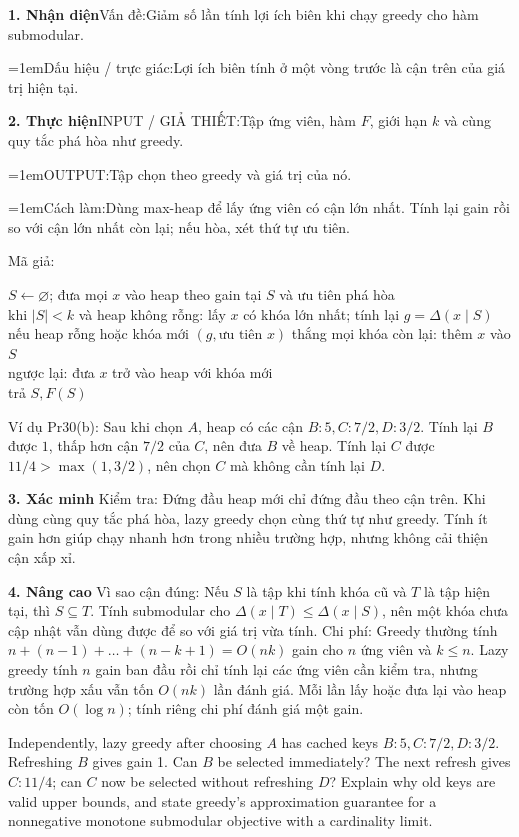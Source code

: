 \documentclass[10pt,a4paper,twocolumn]{article}
\makeatletter
\newcommand{\key}[1]{#1:\enspace}
\newcommand{\qlink}[2]{\hyperref[question:#1]{#2}}
\newcommand{\shareddataref}[1]{%
  \qlink{#1}{\mbox{[#1, tr.~\pageref*{question:#1}]}}}
\newcommand{\algfield}[2]{\par\noindent\hangindent=1em\relax#1:\enspace#2}
\newcommand{\unitheading}[2]{%
  \par\addvspace{1pt}\noindent\textbf{#1. #2}\enspace}
\newcommand{\unitverification}{\unitheading{3}{Xác minh}}
\newcommand{\unitadvanced}{\unitheading{4}{Nâng cao}}
\newcommand{\unitfield}[4]{%
  \par\noindent\textbf{#1. #2}\enspace #3:\enspace #4}
\newcommand{\algsummary}[6]{%
  \begingroup\setlength{\parskip}{1pt}%
  \unitfield{1}{Nhận diện}{Vấn đề}{#1}%
  \algfield{Dấu hiệu / trực giác}{#2}%
  \if\relax\detokenize{#3}\relax\else\par\noindent#3\par\fi%
  \unitfield{2}{Thực hiện}{INPUT / GIẢ THIẾT}{#4}%
  \algfield{OUTPUT}{#5}%
  \algfield{Cách làm}{#6}\par\endgroup}
\newenvironment{algpseudo}{%
  \par\addvspace{2pt}\noindent
  \setlength{\parskip}{0pt}%
  Mã giả:\par\nobreak
  \begin{list}{}{\setlength{\leftmargin}{1em}\setlength{\topsep}{0pt}%
    \setlength{\partopsep}{0pt}\setlength{\parsep}{0pt}%
    \@beginparpenalty=10000\relax}%
  \item\relax
}{\end{list}\par\addvspace{3pt}}
\makeatother
\begin{document}
\algsummary{Giảm số lần tính lợi ích biên khi chạy greedy cho hàm submodular.}{Lợi ích biên tính ở một vòng trước là cận trên của giá trị hiện tại.}{}{Tập ứng viên, hàm $F$, giới hạn $k$ và cùng quy tắc phá hòa như greedy.}{Tập chọn theo greedy và giá trị của nó.}{Dùng max-heap để lấy ứng viên có cận lớn nhất. Tính lại gain rồi so với cận lớn nhất còn lại; nếu hòa, xét thứ tự ưu tiên.}

\begin{algpseudo}
$S\gets\varnothing$; đưa mọi $x$ vào heap theo gain tại $S$ và ưu tiên phá hòa\\
khi $|S|<k$ và heap không rỗng: lấy $x$ có khóa lớn nhất; tính lại $g=\Delta(x\mid S)$\\
\quad nếu heap rỗng hoặc khóa mới $(g,\text{ưu tiên }x)$ thắng mọi khóa còn lại: thêm $x$ vào $S$\\
\quad ngược lại: đưa $x$ trở vào heap với khóa mới\\
trả $S,F(S)$
\end{algpseudo}

\key{Ví dụ Pr30(b)} Sau khi chọn $A$, heap có các cận $B:5,C:7/2,D:3/2$. Tính lại $B$ được $1$, thấp hơn cận $7/2$ của $C$, nên đưa $B$ về heap. Tính lại $C$ được $11/4>\max(1,3/2)$, nên chọn $C$ mà không cần tính lại $D$.

\unitverification
\key{Kiểm tra} Đứng đầu heap mới chỉ đứng đầu theo cận trên. Khi dùng cùng quy tắc phá hòa, lazy greedy chọn cùng thứ tự như greedy. Tính ít gain hơn giúp chạy nhanh hơn trong nhiều trường hợp, nhưng không cải thiện cận xấp xỉ.

\unitadvanced
\key{Vì sao cận đúng} Nếu $S$ là tập khi tính khóa cũ và $T$ là tập hiện tại, thì $S\subseteq T$. Tính submodular cho $\Delta(x\mid T)\le\Delta(x\mid S)$, nên một khóa chưa cập nhật vẫn dùng được để so với giá trị vừa tính.
\key{Chi phí} Greedy thường tính $n+(n-1)+\dots+(n-k+1)=O(nk)$ gain cho $n$ ứng viên và $k\le n$. Lazy greedy tính $n$ gain ban đầu rồi chỉ tính lại các ứng viên cần kiểm tra, nhưng trường hợp xấu vẫn tốn $O(nk)$ lần đánh giá. Mỗi lần lấy hoặc đưa lại vào heap còn tốn $O(\log n)$; tính riêng chi phí đánh giá một gain.

\ask{Pr30b}{Pr30(b)}{Dữ kiện chung: \shareddataref{Pr30}}
 Independently, lazy greedy after choosing $A$ has cached keys $B:5,C:7/2,D:3/2$. Refreshing $B$ gives gain 1. Can $B$ be selected immediately? The next refresh gives $C:11/4$; can $C$ now be selected without refreshing $D$? Explain why old keys are valid upper bounds, and state greedy's approximation guarantee for a nonnegative monotone submodular objective with a cardinality limit.
\end{document}
